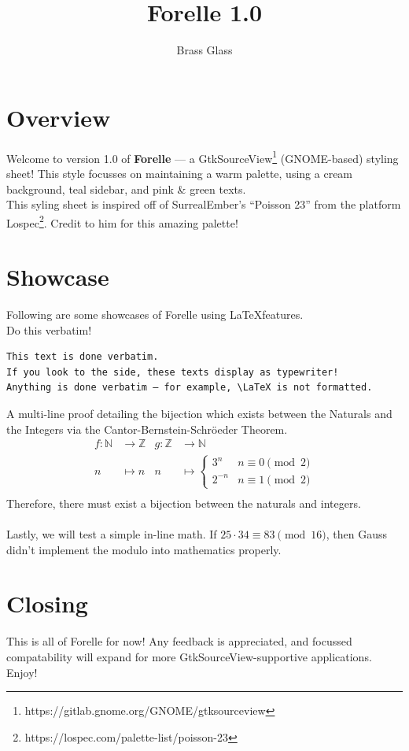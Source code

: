 \documentclass[11pt]{article}
\title{\textbf{Forelle} 1.0}
\author{Brass Glass}
\date{}
\begin{document}
\maketitle
\thispagestyle{empty}

\section{Overview}
Welcome to version 1.0 of \textbf{Forelle} — a GtkSourceView\footnote{https://gitlab.gnome.org/GNOME/gtksourceview} (GNOME-based) styling sheet! This style focusses on maintaining a warm palette, using a cream background, teal sidebar, and pink \& green texts.\\
This syling sheet is inspired off of SurrealEmber’s “Poisson 23” from the platform Lospec\footnote{https://lospec.com/palette-list/poisson-23}. Credit to him for this amazing palette!

\section{Showcase}
Following are some showcases of Forelle using \LaTeX\:features.\\
Do this verbatim!
\begin{verbatim}
This text is done verbatim.
If you look to the side, these texts display as typewriter!
Anything is done verbatim — for example, \LaTeX is not formatted.
\end{verbatim}
A multi-line proof detailing the bijection which exists between the Naturals and the Integers via the Cantor-Bernstein-Schröeder Theorem.
\begin{align*}
f \colon \mathbb{N} &\to \mathbb{Z}   &  g \colon \mathbb{Z} &\to \mathbb{N}\\
n &\mapsto n  &  
n &\mapsto \begin{cases}
	3^n & n \equiv 0 \pmod{2}\\
	2^{-n} & n \equiv 1 \pmod{2}
\end{cases}\\
\end{align*}
Therefore, there must exist a bijection between the naturals and integers.\\\\
Lastly, we will test a simple in-line math. If $25 \cdot 34 \equiv 83 \pmod{16}$, then Gauss didn’t implement the modulo into mathematics properly.\\

\section{Closing}
This is all of Forelle for now! Any feedback is appreciated, and focussed compatability will expand for more GtkSourceView-supportive applications.\\
Enjoy!
\end{document}
